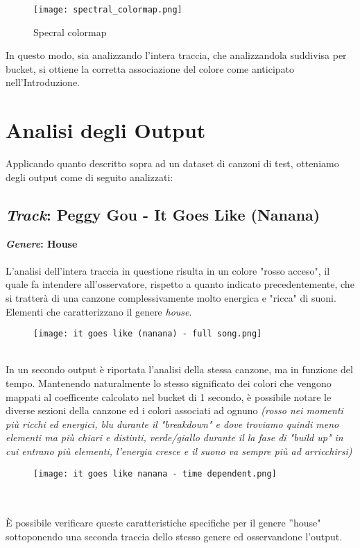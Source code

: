 \documentclass{article}
\begin{document}
\newpage

\begin{figure}[h]
    \centering
    \texttt{[image: spectral\_colormap.png]}
    \caption{Specral colormap}
    \label{fig:enter-label}
\end{figure}

In questo modo, sia analizzando l'intera traccia, che analizzandola suddivisa
per bucket, si ottiene la corretta associazione del colore come anticipato
nell'Introduzione.

\section{Analisi degli Output}
\label{sec:analisi-output}
Applicando quanto descritto sopra ad un dataset di canzoni di test, otteniamo degli output come di seguito analizzati:

\subsection{
    \textit{Track}: Peggy Gou - It Goes Like (Nanana)
}
\textbf{\textit{Genere}: House}\\
\\
L'analisi dell'intera traccia in questione risulta in un colore "rosso acceso", il quale fa intendere all'osservatore, rispetto a quanto indicato precedentemente, che si tratterà di una canzone complessivamente molto energica e "ricca" di suoni. Elementi che caratterizzano il genere \textit{house}.
\begin{figure}[h]
    \centering
    \texttt{[image: it goes like (nanana) - full song.png]}
    \label{fig:peggy-gou-full}
\end{figure}
\\
In un secondo output è riportata l'analisi della stessa canzone, ma in funzione del tempo. Mantenendo naturalmente lo stesso significato dei colori che vengono mappati al coefficente calcolato nel bucket di 1 secondo, è possibile notare le diverse sezioni della canzone ed i colori associati ad ognuno \textit{(rosso nei momenti più ricchi ed energici, blu durante il "breakdown" e dove troviamo quindi meno elementi ma più chiari e distinti, verde/giallo durante il la fase di "build up" in cui entrano più elementi, l'energia cresce e il suono va sempre più ad arricchirsi)}
\begin{figure}[h]
    \centering
    \texttt{[image: it goes like nanana - time dependent.png]}
    \label{fig:peggy-gou-td}
\end{figure}
\\
\\
È possibile verificare queste caratteristiche specifiche per il genere ”house" sottoponendo una seconda traccia dello stesso genere ed osservandone l'output.\\
\end{document}
